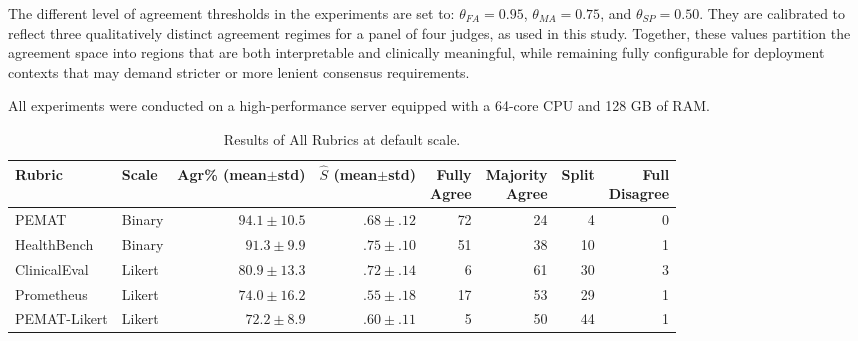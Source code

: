 \documentclass[11pt]{article}
\begin{document}
The different level of agreement thresholds in the experiments are set to: $\theta_{FA} = 0.95$, $\theta_{MA} = 0.75$, and $\theta_{SP} = 0.50$. They are calibrated to reflect three qualitatively distinct agreement regimes for a panel of four judges, as used in this study. %
Together, these values partition the agreement space into regions that are both interpretable and clinically meaningful, while remaining fully configurable for deployment contexts that may demand stricter or more lenient consensus requirements.

All experiments were conducted on a high-performance server equipped with a 64-core CPU and 128 GB of RAM.

\begin{table}[t]
\centering
\footnotesize
\setlength{\tabcolsep}{6pt}
\begin{tabular}{@{}l l
                r r
                r r r r@{}}
\toprule
\textbf{Rubric} & \textbf{Scale}
  & \shortstack{\textbf{Agr\%}\\\textbf{(mean$\pm$std)}}
  & \shortstack{\textbf{$\hat{S}$}\\\textbf{(mean$\pm$std)}}
  & \shortstack{\textbf{Fully}\\\textbf{Agree}}
  & \shortstack{\textbf{Majority}\\\textbf{Agree}}
  & \textbf{Split}
  & \shortstack{\textbf{Full}\\\textbf{Disagree}} \\
\midrule
PEMAT       & Binary & $94.1{\pm}10.5$ & $.68{\pm}.12$ & 72 & 24 &  4 & 0 \\
HealthBench  & Binary & $91.3{\pm}9.9$  & $.75{\pm}.10$ & 51 & 38 & 10 & 1 \\
ClinicalEval & Likert & $80.9{\pm}13.3$ & $.72{\pm}.14$ &  6 & 61 & 30 & 3 \\
Prometheus   & Likert & $74.0{\pm}16.2$ & $.55{\pm}.18$ & 17 & 53 & 29 & 1 \\
PEMAT-Likert & Likert & $72.2{\pm}8.9$  & $.60{\pm}.11$ &  5 & 50 & 44 & 1 \\
\bottomrule
\end{tabular}
\caption{Results of All Rubrics at default scale.}
\label{tab:exp1}
\end{table}
\end{document}
